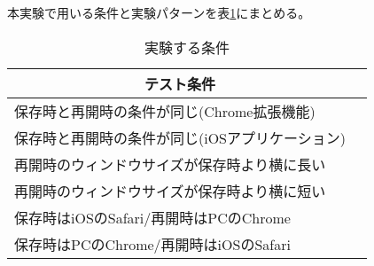 本実験で用いる条件と実験パターンを表\ref{tb:evl-scroll-position}にまとめる。

\begin{table}[htbp]
  \label{tb:evl-scroll-position}
  \caption{実験する条件}
  \begin{center}
    \begin{tabular}{|l|l|}
    \hline
    \multicolumn{1}{|c|}{\textbf{テスト条件}} \\\hline
    保存時と再開時の条件が同じ(Chrome拡張機能) \\ \hline
    保存時と再開時の条件が同じ(iOSアプリケーション) \\ \hline
    再開時のウィンドウサイズが保存時より横に長い  \\ \hline
    再開時のウィンドウサイズが保存時より横に短い  \\ \hline
    保存時はiOSのSafari/再開時はPCのChrome \\ \hline
    保存時はPCのChrome/再開時はiOSのSafari \\ \hline
    \end{tabular}
  \end{center}
\end{table}
